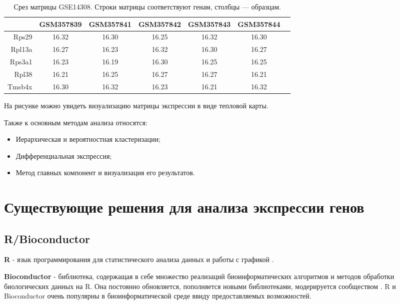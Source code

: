 \documentclass[specification,annotation]{itmo-student-thesis}
\begin{document}
\begin{table}[!h]
\caption{Срез матрицы GSE14308. Строки матрицы соответствуют генам, столбцы --- образцам.}\label{matrix}
\centering
\begin{tabu}{|r|*{6}{c|}}
\hline
       & GSM357839	& GSM357841	& GSM357842	& GSM357843	& GSM357844	 \\\hline
Rps29	 & 16.32	    & 16.30	    & 16.25	    & 16.32	    & 16.30	     \\\hline
Rpl13a & 16.27	    & 16.23	    & 16.32	    & 16.30	    & 16.27	     \\\hline
Rps3a1 & 16.23	    & 16.19	    & 16.30	    & 16.25	    & 16.25	     \\\hline
Rpl38	 & 16.21	    & 16.25	    & 16.27	    & 16.27	    & 16.21	     \\\hline
Tmsb4x & 16.30	    & 16.32	    & 16.23	    & 16.21	    & 16.32	     \\\hline
\end{tabu}
\end{table}

На рисунке можно увидеть визуализацию матрицы экспрессии в виде тепловой карты.

Также к основным методам анализа относятся:
\begin{itemize}
\item Иерархическая и вероятностная кластеризации;
\item Дифференциальная экспрессия;
\item Метод главных компонент и визуализация его результатов.
\end{itemize}

\section{Существующие решения для анализа экспрессии генов}
\subsection{R/Bioconductor}
\textbf{R} - язык программирования для статистического анализа данных и работы с графикой \cite{rproject}.

\textbf{Bioconductor} - библиотека, содержащая в себе множество реализаций биоинформатических алгоритмов и методов обработки биологических данных на R. Она постоянно обновляется, пополняется новыми библиотеками, модерируется сообществом \cite{bioconductor}.
R и Bioconductor очень популярны в биоинформатической среде ввиду предоставляемых возможностей.
\end{document}
